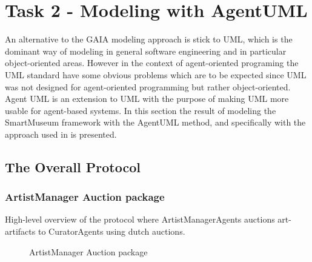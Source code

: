 \documentclass[paper=letter, fontsize=12pt]{article}
\begin{document}
\section{Task 2 - Modeling with AgentUML}
An alternative to the GAIA modeling approach is stick to UML, which is the dominant way of modeling in general software engineering and in particular object-oriented areas. However in the context of agent-oriented programing the UML standard have some obvious problems which are to be expected since UML was not designed for agent-oriented programming but rather object-oriented. Agent UML is an extension to UML with the purpose of making UML more usable for agent-based systems. In this section the result of modeling the SmartMuseum framework with the AgentUML method, and specifically with the approach used in \citep{agent_uml1} is presented.
\subsection{The Overall Protocol}
\subsubsection{ArtistManager Auction package}
High-level overview of the protocol where ArtistManagerAgents auctions art-artifacts to CuratorAgents using dutch auctions.
\begin{figure}[H]
  \begin{center}
    \caption{ArtistManager Auction package}
    \label{fig:artist_auction_template}
  \end{center}
\end{figure}
\end{document}
